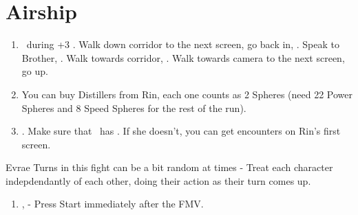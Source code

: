\chapter{Airship}

\begin{enumerate}
	\item \sd\ during \cs+3 \skippablefmv. Walk down corridor to the next screen, go back in, \sd. Speak to Brother, \sd. Walk towards corridor, \sd. Walk towards camera to the next screen, go up.
	\item You can buy Distillers from Rin, each one counts as 2 Spheres (need 22 Power Spheres and 8 Speed Spheres for the rest of the run).
	\item \save. Make sure that \rikku\ has \od. If she doesn't, you can get encounters on Rin's first screen.
\end{enumerate}
\begin{battle}[32000]{Evrae}
	Turns in this fight can be a bit random at times - Treat each character indepdendantly of each other, doing their action as their turn comes up.
	\begin{itemize}
	\end{itemize}
\end{battle}
\begin{enumerate}[resume]
	\item \sd, \skippablefmv[3:00] - Press Start immediately after the FMV.
\end{enumerate}
